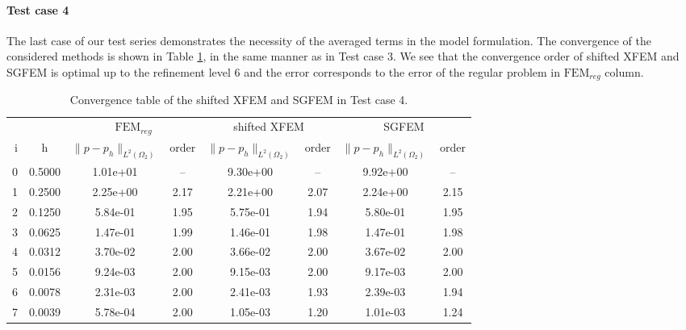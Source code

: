 \paragraph{Test case 4}
The last case of our test series demonstrates the necessity of the averaged terms in the model formulation.
The convergence of the considered methods is shown in Table \ref{tab:convergence_test4}, in the same manner as in Test case 3.
We see that the convergence order of shifted XFEM and SGFEM is optimal up to the refinement level 6 and the error corresponds to
the error of the regular problem in $\textrm{FEM}_{reg}$ column. 
%
\begin{table}[!htb]
\begin{center}
\bgroup
\def\arraystretch{1.2}
\setlength\tabcolsep{5pt}
\begin{tabular}{rc|cc|cc|cc}
\toprule
\multicolumn{2}{c|}{} & \multicolumn{2}{c|}{$\textrm{FEM}_{reg}$} & \multicolumn{2}{c|}{shifted XFEM} & \multicolumn{2}{c}{SGFEM}\\ [3pt] %
i & h & $\|p-p_h\|_{L^2(\Omega_2)}$ & order & $\|p-p_h\|_{L^2(\Omega_2)}$ & order & $\|p-p_h\|_{L^2(\Omega_2)}$ & order \\ [3pt] \midrule
0 & 0.5000 & 1.01e+01 & --   & 9.30e+00 & --   & 9.92e+00 & --   \\ %
1 & 0.2500 & 2.25e+00 & 2.17 & 2.21e+00 & 2.07 & 2.24e+00 & 2.15 \\ %
2 & 0.1250 & 5.84e-01 & 1.95 & 5.75e-01 & 1.94 & 5.80e-01 & 1.95 \\ %
3 & 0.0625 & 1.47e-01 & 1.99 & 1.46e-01 & 1.98 & 1.47e-01 & 1.98 \\ %
4 & 0.0312 & 3.70e-02 & 2.00 & 3.66e-02 & 2.00 & 3.67e-02 & 2.00 \\ %
5 & 0.0156 & 9.24e-03 & 2.00 & 9.15e-03 & 2.00 & 9.17e-03 & 2.00 \\ %
6 & 0.0078 & 2.31e-03 & 2.00 & 2.41e-03 & 1.93 & 2.39e-03 & 1.94 \\ %
7 & 0.0039 & 5.78e-04 & 2.00 & 1.05e-03 & 1.20 & 1.01e-03 & 1.24 \\ %
\bottomrule
\end{tabular}
\egroup
\caption{Convergence table of the shifted XFEM and SGFEM in Test case 4.}
\label{tab:convergence_test4}
\end{center}
\end{table}


